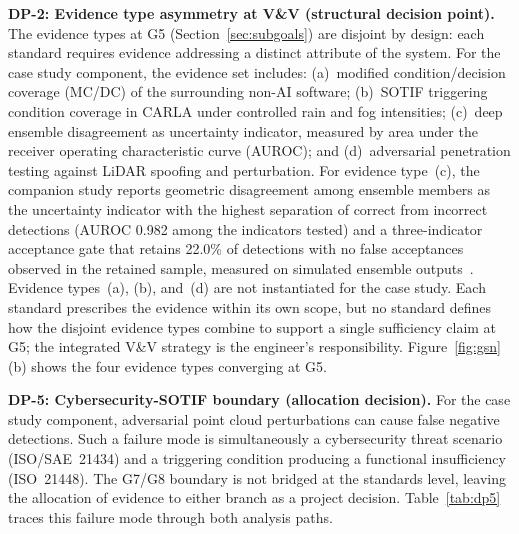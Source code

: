 \documentclass[runningheads]{llncs}
\newcommand{\new}[1]{#1}
\newcommand{\new}[1]{\textcolor{blue}{#1}}
\newcommand{\crev}[1]{\textcolor{blue!75!black}{#1}}
\newcommand{\crev}[1]{#1}
\begin{document}
	\textbf{DP-2: Evidence type asymmetry at V\&V \new{(structural decision point)}.} The evidence types at G5 (Section~\ref{sec:subgoals}) \new{are disjoint by design: each standard requires evidence addressing a distinct attribute of the system}. For the case study component, the evidence set includes: (a)~modified condition/decision coverage (MC/DC) of the surrounding non-AI software; (b)~SOTIF triggering condition coverage in CARLA under controlled rain and fog intensities; (c)~deep ensemble disagreement as uncertainty indicator, measured by area under the receiver operating characteristic curve (AUROC); and (d)~adversarial penetration testing against LiDAR spoofing and perturbation. \crev{For evidence type~(c), the companion study reports geometric disagreement among ensemble members as the uncertainty indicator with the highest separation of correct from incorrect detections (AUROC 0.982 among the indicators tested) and a three-indicator acceptance gate that retains 22.0\% of detections with no false acceptances observed in the retained sample, measured on simulated ensemble outputs~\cite{PatelJungVEHITS2026}. Evidence types~(a), (b), and~(d) are not instantiated for the case study.} \new{Each standard prescribes the evidence within its own scope, but no standard defines how the disjoint evidence types combine to support a single sufficiency claim at G5; the integrated V\&V strategy is the engineer's responsibility.} Figure~\ref{fig:gsn}(b) shows the four evidence types converging at G5.
	
	\textbf{DP-5: Cybersecurity-SOTIF boundary \new{(allocation decision)}.} For the case study component, adversarial point cloud perturbations can cause false negative detections. Such a failure mode is simultaneously a cybersecurity threat scenario (ISO/SAE~21434) and a triggering condition producing a functional insufficiency (ISO~21448). \new{The G7/G8 boundary is not bridged at the standards level, leaving the allocation of evidence to either branch as a project decision.} \crev{Table~\ref{tab:dp5} traces this failure mode through both analysis paths.}
	
\end{document}
